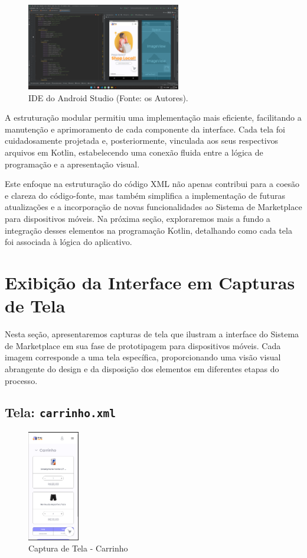 \documentclass[
	12pt,				%
	openright,			%
	twoside,			%
	a4paper,			%
	english,			%
	brazil				%
	]{abntex2}
\begin{document}
\begin{figure}[htb]
    \centering
    \includegraphics[width=0.6\textwidth]{img/IDE-android-studio}
    \caption{IDE do Android Studio (Fonte: os Autores).}
    \label{fig:ide_android_studio}
\end{figure}

A estruturação modular permitiu uma implementação mais eficiente, facilitando a manutenção e aprimoramento de cada componente da interface. Cada tela foi cuidadosamente projetada e, posteriormente, vinculada aos seus respectivos arquivos em Kotlin, estabelecendo uma conexão fluida entre a lógica de programação e a apresentação visual.

Este enfoque na estruturação do código XML não apenas contribui para a coesão e clareza do código-fonte, mas também simplifica a implementação de futuras atualizações e a incorporação de novas funcionalidades ao Sistema de Marketplace para dispositivos móveis. Na próxima seção, exploraremos mais a fundo a integração desses elementos na programação Kotlin, detalhando como cada tela foi associada à lógica do aplicativo.

\section{Exibição da Interface em Capturas de Tela}

Nesta seção, apresentaremos capturas de tela que ilustram a interface do Sistema de Marketplace em sua fase de prototipagem para dispositivos móveis. Cada imagem corresponde a uma tela específica, proporcionando uma visão visual abrangente do design e da disposição dos elementos em diferentes etapas do processo.

\subsection{Tela: \texttt{carrinho.xml}}

\begin{figure}[htb]
    \centering
    \includegraphics[width=0.2\textwidth]{img/carrinho}
    \caption{Captura de Tela - Carrinho}
\end{figure}
\end{document}
